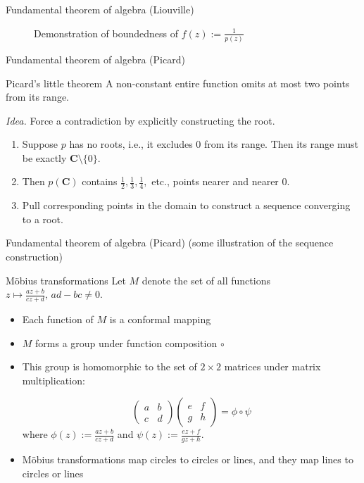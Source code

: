 \documentclass{beamer}
\begin{document}
\begin{frame}[b]{Fundamental theorem of algebra (Liouville)}
\begin{figure}
  \caption{Demonstration of boundedness of \(f(z) := \frac{1}{p(z)}\)}
  \label{fig:boundedness}
\end{figure}
\end{frame}

\begin{frame}[t]{Fundamental theorem of algebra (Picard)} \vspace{4pt}
\begin{block}{Picard's little theorem}
A non-constant entire function omits at most two points from its range.
\end{block}
\textit{Idea.} Force a contradiction by explicitly constructing the root.
\begin{enumerate}
	\item Suppose \(p\) has no roots, i.e., it excludes \(0\) from its range. Then its range must be exactly \(\mathbf{C} \setminus \{0\}\).
	\item Then \(p(\mathbf{C})\) contains \(\frac{1}{2}, \frac{1}{3}, \frac{1}{4},\) etc., points nearer and nearer \(0\).
	\item Pull corresponding points in the domain to construct a sequence converging to a root.
\end{enumerate}
\end{frame}

\begin{frame}[t]{Fundamental theorem of algebra (Picard)} \vspace{4pt}
(some illustration of the sequence construction)
\end{frame}

\begin{frame}[t]{M\"{o}bius transformations} \vspace{4pt}
Let \(M\) denote the set of all functions \(z \mapsto \frac{az + b}{cz + d}, \, ad - bc \ne 0\).
\begin{itemize}
	\item Each function of \(M\) is a conformal mapping
	\item \(M\) forms a group under function composition \(\circ\)
	\item This group is homomorphic to the set of \(2 \times 2\) matrices under matrix multiplication:

	\[
		\begin{pmatrix}a & b \\ c & d\end{pmatrix} \begin{pmatrix}e & f \\ g & h\end{pmatrix} = \phi \circ \psi
	\]
	where \(\phi(z) := \frac{az + b}{cz + d}\) and \(\psi(z) := \frac{ez + f}{gz + h}\).
	\item M\"{o}bius transformations map circles to circles or lines, and they map lines to circles or lines
\end{itemize}
\end{frame}
\end{document}

